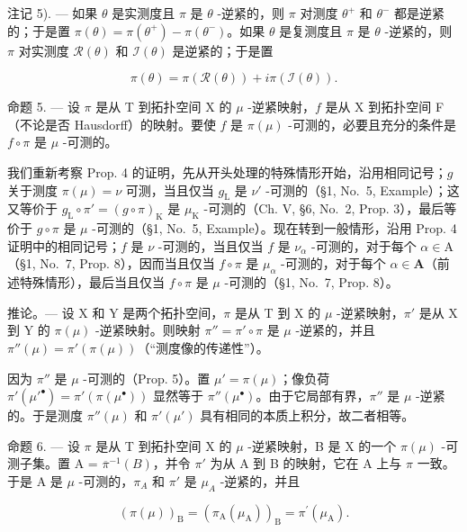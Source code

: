 注记 5). --- 如果 \(\theta\) 是实测度且 \(\pi\) 是 \(\theta\) -逆紧的，则 \(\pi\) 对测度 \(\theta^{+}\) 和 \(\theta^{-}\) 都是逆紧的；于是置 \(\pi(\theta) = \pi(\theta^{+}) - \pi(\theta^{-})\)。如果 \(\theta\) 是复测度且 \(\pi\) 是 \(\theta\) -逆紧的，则 \(\pi\) 对实测度 \(\mathcal{R}(\theta)\) 和 \(\mathcal{I}(\theta)\) 是逆紧的；于是置

\[
\pi (\theta) = \pi (\mathcal {R} (\theta)) + i \pi (\mathcal {I} (\theta)).
\]

命题 5. --- 设 \(\pi\) 是从 T 到拓扑空间 X 的 \(\mu\) -逆紧映射，\(f\) 是从 X 到拓扑空间 F（不论是否 Hausdorff）的映射。要使 \(f\) 是 \(\pi(\mu)\) -可测的，必要且充分的条件是 \(f \circ \pi\) 是 \(\mu\) -可测的。

我们重新考察 Prop. 4 的证明，先从开头处理的特殊情形开始，沿用相同记号；\(g\) 关于测度 \(\pi(\mu) = \nu\) 可测，当且仅当 \(g_{\mathrm{L}}\) 是 \(\nu'\) -可测的（§1, No.~5, Example）；这又等价于 \(g_{\mathrm{L}} \circ \pi' = (g \circ \pi)_{\mathrm{K}}\) 是 \(\mu_{\mathrm{K}}\) -可测的（Ch. V, §6, No.~2, Prop. 3），最后等价于 \(g \circ \pi\) 是 \(\mu\) -可测的（§1, No.~5, Example）。现在转到一般情形，沿用 Prop. 4 证明中的相同记号；\(f\) 是 \(\nu\) -可测的，当且仅当 \(f\) 是 \(\nu_{\alpha}\) -可测的，对于每个 \(\alpha \in \mathrm{A}\)（§1, No.~7, Prop. 8），因而当且仅当 \(f \circ \pi\) 是 \(\mu_{\alpha}\) -可测的，对于每个 \(\alpha \in \mathbf{A}\)（前述特殊情形），最后当且仅当 \(f \circ \pi\) 是 \(\mu\) -可测的（§1, No.~7, Prop. 8）。

推论。--- 设 X 和 Y 是两个拓扑空间，\(\pi\) 是从 T 到 X 的 \(\mu\) -逆紧映射，\(\pi'\) 是从 X 到 Y 的 \(\pi(\mu)\) -逆紧映射。则映射 \(\pi'' = \pi' \circ \pi\) 是 \(\mu\) -逆紧的，并且 \(\pi''(\mu) = \pi'(\pi(\mu))\)（“测度像的传递性”）。

因为 \(\pi''\) 是 \(\mu\) -可测的（Prop. 5）。置 \(\mu' = \pi(\mu)\)；像负荷 \(\pi'(\mu'^{\bullet}) = \pi'(\pi(\mu^{\bullet}))\) 显然等于 \(\pi''(\mu^{\bullet})\)。由于它局部有界，\(\pi''\) 是 \(\mu\) -逆紧的。于是测度 \(\pi''(\mu)\) 和 \(\pi'(\mu')\) 具有相同的本质上积分，故二者相等。

命题 6. --- 设 \(\pi\) 是从 T 到拓扑空间 X 的 \(\mu\) -逆紧映射，B 是 X 的一个 \(\pi(\mu)\) -可测子集。置 A = \(\overline{\pi}^{-1}(B)\)，并令 \(\pi'\) 为从 A 到 B 的映射，它在 A 上与 \(\pi\) 一致。于是 A 是 \(\mu\) -可测的，\(\pi_A\) 和 \(\pi'\) 是 \(\mu_A\) -逆紧的，并且

\[
\left(\pi (\mu)\right) _ {\mathrm{B}} = \left(\pi_ {\mathrm{A}} (\mu_ {\mathrm{A}})\right) _ {\mathrm{B}} = \pi^ {\prime} (\mu_ {\mathrm{A}}).\tag{2}
\]


